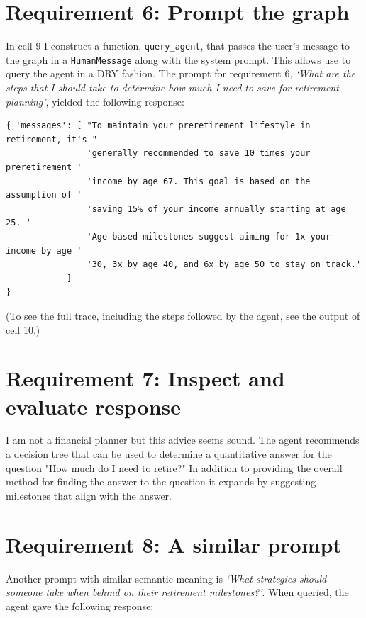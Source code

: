 \documentclass[11pt,letterpaper]{article}
\begin{document}
\section*{Requirement 6: Prompt the graph}
\tab In cell 9 I construct a function, \texttt{query\_agent}, that passes the user's message to the graph in a \texttt{HumanMessage} along with the system prompt. This allows use to query the agent in a DRY fashion. The prompt for requirement 6, \textit{`What are the steps that I should take to determine how much I need to save for retirement planning'}, yielded the following response:

\begin{verbatim}
{ 'messages': [ "To maintain your preretirement lifestyle in retirement, it's "
                'generally recommended to save 10 times your preretirement '
                'income by age 67. This goal is based on the assumption of '
                'saving 15% of your income annually starting at age 25. '
                'Age-based milestones suggest aiming for 1x your income by age '
                '30, 3x by age 40, and 6x by age 50 to stay on track.'
            ]
}
\end{verbatim}
(To see the full trace, including the steps followed by the agent, see the output of cell 10.)

\clearpage

\section*{Requirement 7: Inspect and evaluate response}
\tab I am not a financial planner but this advice seems sound. The agent recommends a 
decision tree that can be used to determine a quantitative answer for the question
"How much do I need to retire?" In addition to providing the overall method for finding the 
answer to the question it expands by suggesting milestones that align with the answer.

\section*{Requirement 8: A similar prompt}
\tab Another prompt with similar semantic meaning is \textit{`What strategies should someone take when behind on their retirement milestones?'}.
When queried, the agent gave the following response:
\end{document}
